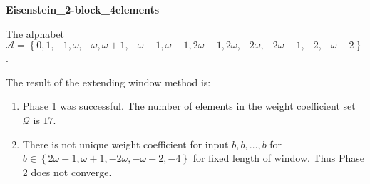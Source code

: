 \begin{exmp}
\textbf{ Eisenstein\_2-block\_4elements }

\label{ex:Eisenstein2-block4elements}

The alphabet $\mathcal{A} =\left\{0, 1, -1, \omega, -\omega, \omega + 1, -\omega - 1, \omega - 1, 2\omega - 1, 2\omega, -2\omega, -2\omega - 1, -2, -\omega - 2\right\}$.

The result of the extending window method is:
\begin{enumerate}
    \item Phase 1 was successful.
The number of elements in the weight coefficient set $\mathcal{Q}$ is $17$.

    \item There is not unique weight coefficient for input $b,b,\dots,b$ for $b\in\left\{2\omega - 1, \omega + 1, -2\omega, -\omega - 2, -4\right\}$ for fixed length of window. Thus Phase 2 does not converge.

\end{enumerate}
\end{exmp}
